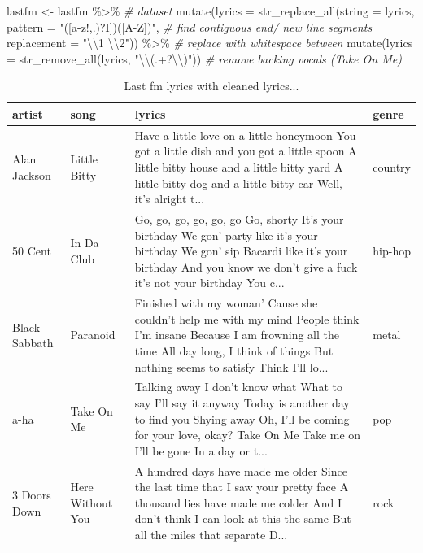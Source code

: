 \documentclass[
]{article}
\newenvironment{Shaded}{\begin{snugshade}}{\end{snugshade}}
\newcommand{\AttributeTok}[1]{\textcolor[rgb]{0.77,0.63,0.00}{#1}}
\newcommand{\CommentTok}[1]{\textcolor[rgb]{0.56,0.35,0.01}{\textit{#1}}}
\newcommand{\FunctionTok}[1]{\textcolor[rgb]{0.00,0.00,0.00}{#1}}
\newcommand{\NormalTok}[1]{#1}
\newcommand{\OtherTok}[1]{\textcolor[rgb]{0.56,0.35,0.01}{#1}}
\newcommand{\SpecialCharTok}[1]{\textcolor[rgb]{0.00,0.00,0.00}{#1}}
\newcommand{\StringTok}[1]{\textcolor[rgb]{0.31,0.60,0.02}{#1}}
\begin{document}
\begin{Shaded}
\begin{Highlighting}[]
\NormalTok{lastfm }\OtherTok{\textless{}{-}} 
\NormalTok{  lastfm }\SpecialCharTok{\%\textgreater{}\%} \CommentTok{\# dataset}
  \FunctionTok{mutate}\NormalTok{(}\AttributeTok{lyrics =} 
           \FunctionTok{str\_replace\_all}\NormalTok{(}\AttributeTok{string =}\NormalTok{ lyrics, }
                           \AttributeTok{pattern =} \StringTok{"([a{-}z\textquotesingle{}!,.)?I])([A{-}Z])"}\NormalTok{, }\CommentTok{\# find contiguous end/ new line segments}
                           \AttributeTok{replacement =} \StringTok{"}\SpecialCharTok{\textbackslash{}\textbackslash{}}\StringTok{1 }\SpecialCharTok{\textbackslash{}\textbackslash{}}\StringTok{2"}\NormalTok{)) }\SpecialCharTok{\%\textgreater{}\%}  \CommentTok{\# replace with whitespace between}
  \FunctionTok{mutate}\NormalTok{(}\AttributeTok{lyrics =} \FunctionTok{str\_remove\_all}\NormalTok{(lyrics, }\StringTok{"}\SpecialCharTok{\textbackslash{}\textbackslash{}}\StringTok{(.+?}\SpecialCharTok{\textbackslash{}\textbackslash{}}\StringTok{)"}\NormalTok{)) }\CommentTok{\# remove backing vocals (Take On Me)}
\end{Highlighting}
\end{Shaded}

\begin{table}

\caption{\label{tab:td-lastfm-clean-end-lines-preview}Last fm lyrics with cleaned lyrics...}
\centering
\begin{tabular}[t]{llll}
\toprule
artist & song & lyrics & genre\\
\midrule
Alan Jackson & Little Bitty & Have a little love on a little honeymoon You got a little dish and you got a little spoon A little bitty house and a little bitty yard A little bitty dog and a little bitty car Well, it's alright t... & country\\
50 Cent & In Da Club & Go, go, go, go, go, go Go, shorty It's your birthday We gon' party like it's your birthday We gon' sip Bacardi like it's your birthday And you know we don't give a fuck it's not your birthday You c... & hip-hop\\
Black Sabbath & Paranoid & Finished with my woman' Cause she couldn't help me with my mind People think I'm insane Because I am frowning all the time All day long, I think of things But nothing seems to satisfy Think I'll lo... & metal\\
a-ha & Take On Me & Talking away I don't know what What to say I'll say it anyway Today is another day to find you Shying away Oh, I'll be coming for your love, okay? Take On Me  Take me on  I'll be gone In a day or t... & pop\\
3 Doors Down & Here Without You & A hundred days have made me older Since the last time that I saw your pretty face A thousand lies have made me colder And I don't think I can look at this the same But all the miles that separate D... & rock\\
\bottomrule
\end{tabular}
\end{table}
\end{document}
